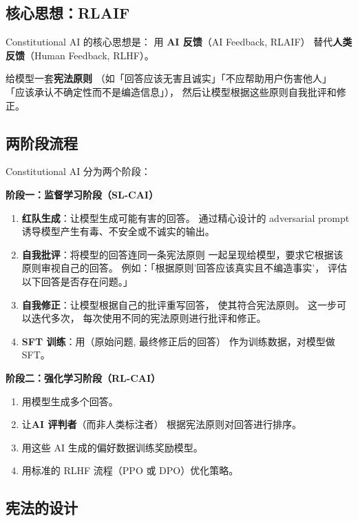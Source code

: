 \subsection{核心思想：RLAIF}

Constitutional AI 的核心思想是：
用 \textbf{AI 反馈}（AI Feedback, RLAIF）
替代\textbf{人类反馈}（Human Feedback, RLHF）。

给模型一套\textbf{宪法原则}
（如「回答应该无害且诚实」「不应帮助用户伤害他人」
「应该承认不确定性而不是编造信息」），
然后让模型根据这些原则自我批评和修正。

\subsection{两阶段流程}

Constitutional AI 分为两个阶段：

\textbf{阶段一：监督学习阶段（SL-CAI）}
\begin{enumerate}[noitemsep]
  \item \textbf{红队生成}：让模型生成可能有害的回答。
        通过精心设计的 adversarial prompt
        诱导模型产生有毒、不安全或不诚实的输出。
  \item \textbf{自我批评}：将模型的回答连同一条宪法原则
        一起呈现给模型，要求它根据该原则审视自己的回答。
        例如：「根据原则'回答应该真实且不编造事实'，
        评估以下回答是否存在问题。」
  \item \textbf{自我修正}：让模型根据自己的批评重写回答，
        使其符合宪法原则。
        这一步可以迭代多次，
        每次使用不同的宪法原则进行批评和修正。
  \item \textbf{SFT 训练}：用（原始问题, 最终修正后的回答）
        作为训练数据，对模型做 SFT。
\end{enumerate}

\textbf{阶段二：强化学习阶段（RL-CAI）}
\begin{enumerate}[noitemsep]
  \item 用模型生成多个回答。
  \item 让\textbf{AI 评判者}（而非人类标注者）
        根据宪法原则对回答进行排序。
  \item 用这些 AI 生成的偏好数据训练奖励模型。
  \item 用标准的 RLHF 流程（PPO 或 DPO）优化策略。
\end{enumerate}

\subsection{宪法的设计}

